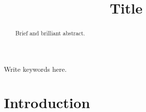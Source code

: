 \documentclass[english]{ieej-e-samcon}
\title[Short Title]{Title}
\begin{document}
\begin{abstract}
Brief and brilliant abstract.
\end{abstract}

\begin{keyword}
Write keywords here.
\end{keyword}

\maketitle

\section{Introduction}



\end{document}

